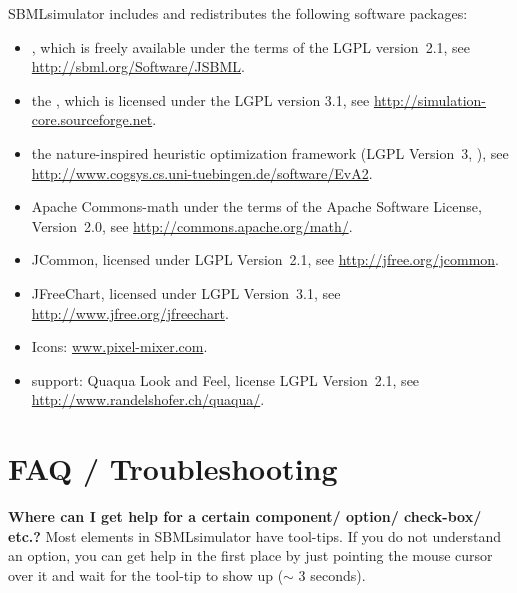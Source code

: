 SBMLsimulator includes and redistributes the following software packages:
\begin{itemize}
\item \JSBML \citep{Draeger2011}, which is freely available under the terms of the \ac{LGPL} version~2.1, see \href{http://sbml.org/Software/JSBML}{\url{http://sbml.org/Software/JSBML}}.
\item the \SBSCL \citep{Keller2013}, which is licensed under the \ac{LGPL} version 3.1, see \href{http://simulation-core.sourceforge.net}{\url{http://simulation-core.sourceforge.net}}.
\item the nature-inspired heuristic optimization framework \EvA (\ac{LGPL} Version~3, \citealp{Kron10EvA2}), see \href{http://www.cogsys.cs.uni-tuebingen.de/software/EvA2}{\url{http://www.cogsys.cs.uni-tuebingen.de/software/EvA2}}.
\item Apache Commons-math under the terms of the Apache Software License, Version~2.0, see \href{http://commons.apache.org/math/}{\url{http://commons.apache.org/math/}}.
\item JCommon, licensed under \ac{LGPL} Version~2.1, see \href{http://jfree.org/jcommon}{\url{http://jfree.org/jcommon}}.
\item JFreeChart, licensed under \ac{LGPL} Version~3.1, see \href{http://www.jfree.org/jfreechart}{\url{http://www.jfree.org/jfreechart}}.
\item Icons: \href{http://www.pixel-mixer.com}{\url{www.pixel-mixer.com}}.
\item \MacOSX support: Quaqua Look and Feel, license \ac{LGPL} Version~2.1, see \href{http://www.randelshofer.ch/quaqua/}{\url{http://www.randelshofer.ch/quaqua/}}.
\end{itemize}

\chapter{FAQ / Troubleshooting}
\label{ch:faq}


\noindent \textbf{Where can I get help for a certain component/ option/ check-box/ etc.?}\newline
Most elements in SBMLsimulator have tool-tips. If you do not understand an option, you
can get help in the first place by just pointing the mouse cursor over it and
wait for the tool-tip to show up ($\sim$ 3 seconds).\newline

